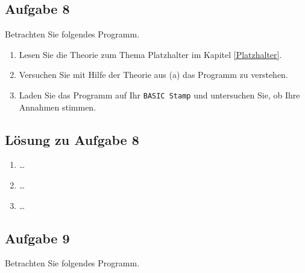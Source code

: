 \newpage
\subsection{Aufgabe 8}
Betrachten Sie folgendes Programm.


\begin{enumerate}[label=(\alph*)]
\item Lesen Sie die Theorie zum Thema Platzhalter im Kapitel \ref{Platzhalter}.
\item Versuchen Sie mit Hilfe der Theorie aus (a) das Programm zu verstehen.
\item Laden Sie das Programm auf Ihr \verb|BASIC Stamp| und untersuchen Sie, 
ob Ihre Annahmen stimmen.
\end{enumerate}

\ifteacher
\newpage
\subsection{Lösung zu Aufgabe 8}
\begin{enumerate}[label=(\alph*)]
\item \dots
\item \dots
\item \dots
\end{enumerate}
\fi

\newpage
\subsection{Aufgabe 9}
Betrachten Sie folgendes Programm.


